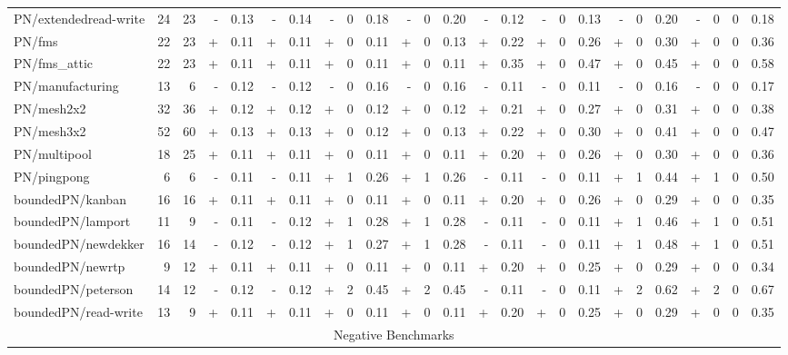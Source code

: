 \documentclass{article}
\begin{document}
\begin{table}[h]
\begin{center}
\begin{tabular}{ | l | r | r | *{22}{ r | } }
PN/extendedread-write & 24 & 23 & - & 0.13 & - & 0.14 & - & 0 & 0.18 & - & 0 & 0.20 & - & 0.12 & - & 0 & 0.13 & - & 0 & 0.20 & - & 0 & 0 & 0.18 \\
PN/fms & 22 & 23 & + & 0.11 & + & 0.11 & + & 0 & 0.11 & + & 0 & 0.13 & + & 0.22 & + & 0 & 0.26 & + & 0 & 0.30 & + & 0 & 0 & 0.36 \\
PN/fms\_attic & 22 & 23 & + & 0.11 & + & 0.11 & + & 0 & 0.11 & + & 0 & 0.11 & + & 0.35 & + & 0 & 0.47 & + & 0 & 0.45 & + & 0 & 0 & 0.58 \\
PN/manufacturing & 13 & 6 & - & 0.12 & - & 0.12 & - & 0 & 0.16 & - & 0 & 0.16 & - & 0.11 & - & 0 & 0.11 & - & 0 & 0.16 & - & 0 & 0 & 0.17 \\
PN/mesh2x2 & 32 & 36 & + & 0.12 & + & 0.12 & + & 0 & 0.12 & + & 0 & 0.12 & + & 0.21 & + & 0 & 0.27 & + & 0 & 0.31 & + & 0 & 0 & 0.38 \\
PN/mesh3x2 & 52 & 60 & + & 0.13 & + & 0.13 & + & 0 & 0.12 & + & 0 & 0.13 & + & 0.22 & + & 0 & 0.30 & + & 0 & 0.41 & + & 0 & 0 & 0.47 \\
PN/multipool & 18 & 25 & + & 0.11 & + & 0.11 & + & 0 & 0.11 & + & 0 & 0.11 & + & 0.20 & + & 0 & 0.26 & + & 0 & 0.30 & + & 0 & 0 & 0.36 \\
PN/pingpong & 6 & 6 & - & 0.11 & - & 0.11 & + & 1 & 0.26 & + & 1 & 0.26 & - & 0.11 & - & 0 & 0.11 & + & 1 & 0.44 & + & 1 & 0 & 0.50 \\
boundedPN/kanban & 16 & 16 & + & 0.11 & + & 0.11 & + & 0 & 0.11 & + & 0 & 0.11 & + & 0.20 & + & 0 & 0.26 & + & 0 & 0.29 & + & 0 & 0 & 0.35 \\
boundedPN/lamport & 11 & 9 & - & 0.11 & - & 0.12 & + & 1 & 0.28 & + & 1 & 0.28 & - & 0.11 & - & 0 & 0.11 & + & 1 & 0.46 & + & 1 & 0 & 0.51 \\
boundedPN/newdekker & 16 & 14 & - & 0.12 & - & 0.12 & + & 1 & 0.27 & + & 1 & 0.28 & - & 0.11 & - & 0 & 0.11 & + & 1 & 0.48 & + & 1 & 0 & 0.51 \\
boundedPN/newrtp & 9 & 12 & + & 0.11 & + & 0.11 & + & 0 & 0.11 & + & 0 & 0.11 & + & 0.20 & + & 0 & 0.25 & + & 0 & 0.29 & + & 0 & 0 & 0.34 \\
boundedPN/peterson & 14 & 12 & - & 0.12 & - & 0.12 & + & 2 & 0.45 & + & 2 & 0.45 & - & 0.11 & - & 0 & 0.11 & + & 2 & 0.62 & + & 2 & 0 & 0.67 \\
boundedPN/read-write & 13 & 9 & + & 0.11 & + & 0.11 & + & 0 & 0.11 & + & 0 & 0.11 & + & 0.20 & + & 0 & 0.25 & + & 0 & 0.29 & + & 0 & 0 & 0.35 \\
    \hline
        \multicolumn{25}{|c|}{Negative Benchmarks} \\

\end{tabular}
\end{center}
\end{table}
\end{document}
